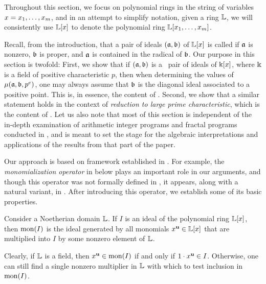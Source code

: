 \documentclass{article}
\begin{document}
Throughout this section, we focus on polynomial rings in the string of variables $x = x_1, \ldots, x_m$, and in an attempt to simplify notation,  given a ring $\mathbb{L}$, we will {consistently} use $\mathbb{L}[x]$ to denote the polynomial ring $\mathbb{L}[x_1, \ldots, x_m]$.

Recall, from {the introduction}, that a pair of ideals $(\mathfrak{a}, \mathfrak{b})$ of $\mathbb{L}[x]$ is called \emph{\compatible}
if $\mathfrak{a}$ is nonzero, $\mathfrak{b}$ is proper, and $\mathfrak{a}$ is contained in the radical of $\mathfrak{b}$.  
Our purpose in this section is twofold:  First, we show that if $(\mathfrak{a}, \mathfrak{b})$ is a \compatible\ pair of ideals of $\Bbbk[x]$, where $\Bbbk$ is a field of positive characteristic $p$, then when determining the values of $\mu(\mathfrak{a}, \mathfrak{b}, p^e)$, one may always assume that $\mathfrak{b}$ is the diagonal ideal associated to a positive point.   This is, in essence, the content of .  Second, we show that a similar statement holds in the context of \emph{reduction to large prime characteristic}, which is the content of .
Let us also note that most of this section is independent of the in-depth examination of arithmetic integer programs and fractal programs conducted in , and is meant to set the stage for the algebraic interpretations and applications of the results from that part of the paper. 

Our approach is based on framework established in \cite[Appendix]{budur+mustata+saito.roots_bs_polys_monomial}.  For example, the \emph{monomialization operator} in  below plays an important role in our arguments, and though this operator was not formally defined in \loccit, it appears, along with a natural variant, in \cite[Proposition 6.1 and Lemma 6.2]{budur+mustata+saito.roots_bs_polys_monomial}.  After introducing this operator, we establish some of its basic properties.

\begin{definition}
\label{monomialization: D}
Consider a Noetherian domain $\mathbb{L}$.  If $I$ is an ideal of the polynomial ring $\mathbb{L}[x]$, then $\operatorname{mon}(I)$ is the ideal generated by all monomials $x^{\mathbf{u}} \in \mathbb{L}[x]$ that are multiplied into $I$ by some nonzero element of $\mathbb{L}$.
\end{definition}

Clearly, if $\mathbb{L}$ is a field, then $x^{\mathbf{u}} \in \operatorname{mon}(I)$ if and only if $1 \cdot x^{\mathbf{u}} \in I$.  Otherwise, one can still find a single nonzero multiplier in $\mathbb{L}$ with which to test inclusion in $\operatorname{mon}(I)$.  
\end{document}
